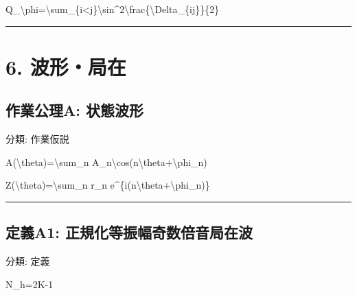 \documentclass[
  a4paper,
]{ltjsarticle}
\newenvironment{Shaded}{}{}
\newcommand{\NormalTok}[1]{#1}
\begin{document}
\begin{Shaded}
\begin{Highlighting}[]
\NormalTok{Q\_\textbackslash{}phi=\textbackslash{}sum\_\{i\textless{}j\}\textbackslash{}sin\^{}2\textbackslash{}frac\{\textbackslash{}Delta\_\{ij\}\}\{2\}}
\end{Highlighting}
\end{Shaded}

\begin{center}\rule{0.5\linewidth}{0.5pt}\end{center}

\section{6. 波形・局在}\label{ux6ce2ux5f62ux5c40ux5728}

\subsection{作業公理A:
状態波形}\label{ux4f5cux696dux516cux7406a-ux72b6ux614bux6ce2ux5f62}

分類: 作業仮説

\begin{Shaded}
\begin{Highlighting}[]
\NormalTok{A(\textbackslash{}theta)=\textbackslash{}sum\_n A\_n\textbackslash{}cos(n\textbackslash{}theta+\textbackslash{}phi\_n)}
\end{Highlighting}
\end{Shaded}

\begin{Shaded}
\begin{Highlighting}[]
\NormalTok{Z(\textbackslash{}theta)=\textbackslash{}sum\_n r\_n e\^{}\{i(n\textbackslash{}theta+\textbackslash{}phi\_n)\}}
\end{Highlighting}
\end{Shaded}

\begin{center}\rule{0.5\linewidth}{0.5pt}\end{center}

\subsection{定義A1:
正規化等振幅奇数倍音局在波}\label{ux5b9aux7fa9a1-ux6b63ux898fux5316ux7b49ux632fux5e45ux5947ux6570ux500dux97f3ux5c40ux5728ux6ce2}

分類: 定義

\begin{Shaded}
\begin{Highlighting}[]
\NormalTok{N\_h=2K{-}1}
\end{Highlighting}
\end{Shaded}
\end{document}
